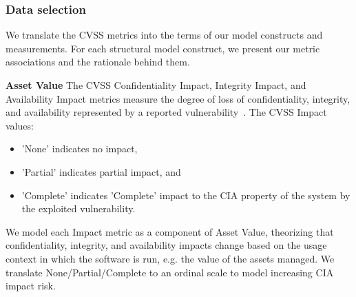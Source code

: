 \subsubsection{Data selection}
\label{sec:evaluation_nvd_selection}
 We translate the CVSS metrics into the terms of our model constructs and measurements. For each structural model construct, we present our metric associations and the rationale behind them.
 
\textbf{Asset Value}
The CVSS Confidentiality Impact, Integrity Impact, and Availability Impact metrics measure the degree of loss of confidentiality, integrity, and availability represented by a reported vulnerability~\cite{mell2007complete}. The CVSS Impact values:
	\begin{itemize}
		\item 'None' indicates no impact, 
		\item 'Partial' indicates partial impact, and 
		\item 'Complete' indicates 'Complete' impact to the CIA property of the system by the exploited vulnerability.  
	\end{itemize}
We model each Impact metric as a component of Asset Value, theorizing that confidentiality, integrity, and availability impacts change based on the usage context in which the software is run, e.g. the value of the assets managed. We translate None/Partial/Complete to an ordinal scale to model increasing CIA impact risk.

